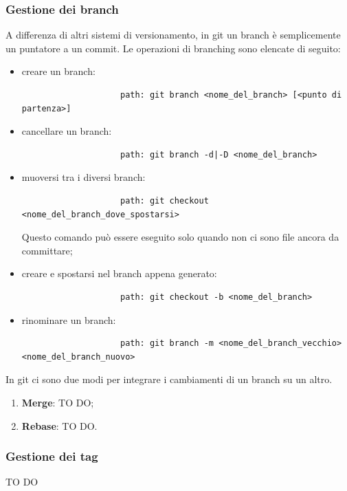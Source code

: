 		
		\subsubsection{Gestione dei branch} %
		\label{ssub:gestione_dei_branch_locale}
		A differenza di altri sistemi di versionamento, in git un branch è semplicemente un puntatore a un commit. \newline
		Le operazioni di branching sono elencate di seguito:
			\begin{itemize}
				\item creare un branch:
					\begin{verbatim}
					path: git branch <nome_del_branch> [<punto di partenza>]
					\end{verbatim}
				\item cancellare un branch:
					\begin{verbatim}
					path: git branch -d|-D <nome_del_branch>
					\end{verbatim}
				\item muoversi tra i diversi branch:
					\begin{verbatim}
					path: git checkout <nome_del_branch_dove_spostarsi>
					\end{verbatim}
				Questo comando può essere eseguito solo quando non ci sono file ancora da committare;
				\item creare e spostarsi nel branch appena generato:
					\begin{verbatim}
					path: git checkout -b <nome_del_branch>
					\end{verbatim}
				\item rinominare un branch:
					\begin{verbatim}
					path: git branch -m <nome_del_branch_vecchio> <nome_del_branch_nuovo>
					\end{verbatim}
			\end{itemize}
			\noindent
		
		In git ci sono due modi per integrare i cambiamenti di un branch su un altro.
			\begin{enumerate}
				\item \textbf{Merge}: TO DO;
				
				
				\item \textbf{Rebase}: TO DO.
			\end{enumerate}


		\subsubsection{Gestione dei tag} %
		\label{ssub:gestione_dei_tag_locale}
		TO DO

